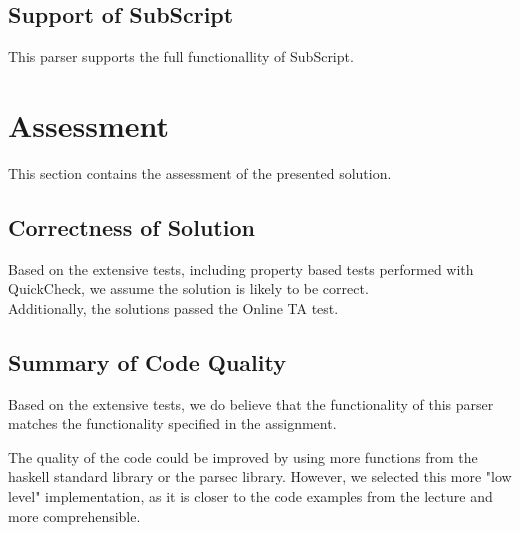 \documentclass[11pt, a4paper]{article}
\begin{document}
\subsection{Support of SubScript}

This parser supports the full functionallity of SubScript.

\pagebreak
\section{Assessment}
This section contains the assessment of the presented solution.


\subsection{Correctness of Solution}
Based on the extensive tests, including property based tests performed with QuickCheck, we assume the solution is likely to be correct.
\\
Additionally, the solutions passed the Online TA test.

\subsection{Summary of Code Quality}
Based on the extensive tests, we do believe that the functionality of this parser matches the functionality specified in the assignment. 

The quality of the code could be improved by using more functions from the haskell standard library or the parsec library. However, we selected this more "low level" implementation, as it is closer to the code examples from the lecture and more comprehensible.
\end{document}
